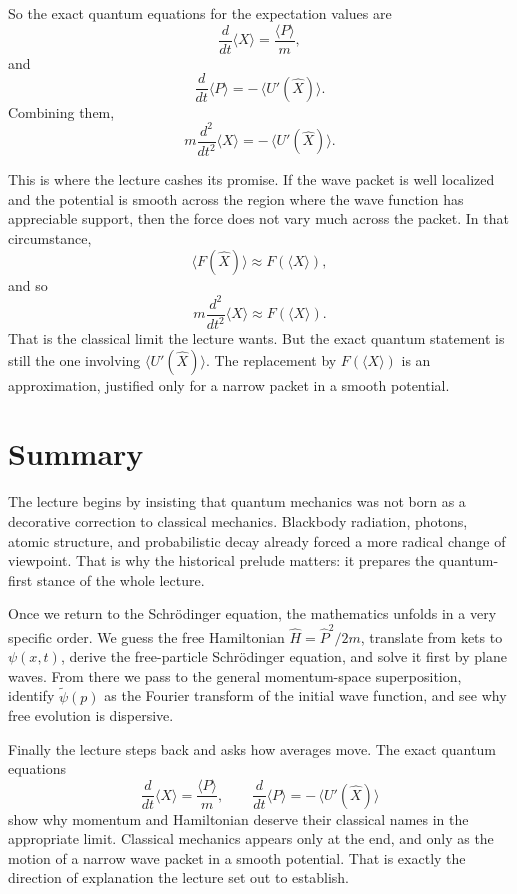 So the exact quantum equations for the expectation values are
\begin{equation}
\frac{d}{dt}\langle X\rangle=\frac{\langle P\rangle}{m},
\end{equation}
and
\begin{equation}
\frac{d}{dt}\langle P\rangle=-\,\langle U'(\hat X)\rangle.
\end{equation}
Combining them,
\begin{equation}
m\frac{d^2}{dt^2}\langle X\rangle=-\,\langle U'(\hat X)\rangle.
\end{equation}

This is where the lecture cashes its promise. If the wave packet is well localized and the potential is smooth across the region where the wave function has appreciable support, then the force does not vary much across the packet. In that circumstance,
\begin{equation}
\langle F(\hat X)\rangle \approx F(\langle X\rangle),
\end{equation}
and so
\begin{equation}
m\frac{d^2}{dt^2}\langle X\rangle \approx F(\langle X\rangle).
\end{equation}
That is the classical limit the lecture wants. But the exact quantum statement is still the one involving \(\langle U'(\hat X)\rangle\). The replacement by \(F(\langle X\rangle)\) is an approximation, justified only for a narrow packet in a smooth potential.

\section{Summary}

The lecture begins by insisting that quantum mechanics was not born as a decorative correction to classical mechanics. Blackbody radiation, photons, atomic structure, and probabilistic decay already forced a more radical change of viewpoint. That is why the historical prelude matters: it prepares the quantum-first stance of the whole lecture.

Once we return to the Schr\"odinger equation, the mathematics unfolds in a very specific order. We guess the free Hamiltonian \(\hat H=\hat P^2/2m\), translate from kets to \(\psi(x,t)\), derive the free-particle Schr\"odinger equation, and solve it first by plane waves. From there we pass to the general momentum-space superposition, identify \(\tilde\psi(p)\) as the Fourier transform of the initial wave function, and see why free evolution is dispersive.

Finally the lecture steps back and asks how averages move. The exact quantum equations
\begin{equation}
\frac{d}{dt}\langle X\rangle=\frac{\langle P\rangle}{m},
\qquad
\frac{d}{dt}\langle P\rangle=-\,\langle U'(\hat X)\rangle
\end{equation}
show why momentum and Hamiltonian deserve their classical names in the appropriate limit. Classical mechanics appears only at the end, and only as the motion of a narrow wave packet in a smooth potential. That is exactly the direction of explanation the lecture set out to establish.